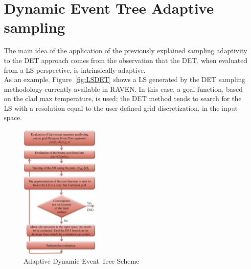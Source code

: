 \documentclass{anstrans}
\begin{document}
\section{Dynamic Event Tree Adaptive sampling}
The main idea of the application of the previously explained sampling adaptivity to the DET approach comes from the observation that the DET, when evaluated from a LS perspective, is intrinsically adaptive.
\\ As an example, Figure~\ref{fig:LSDET}  shows a LS generated by the DET sampling methodology currently available in RAVEN. In this case, a goal function, based on the clad max temperature, is used; the DET method tends to search for the LS with a resolution equal to the user defined grid discretization, in the input space.
\begin{figure}
  \centering
     \includegraphics[width=0.35\textwidth]{AdaptiveDET.png}
  \caption{Adaptive Dynamic Event Tree Scheme}
  \label{fig:AdaptiveDET}
\end{figure}
\end{document}
